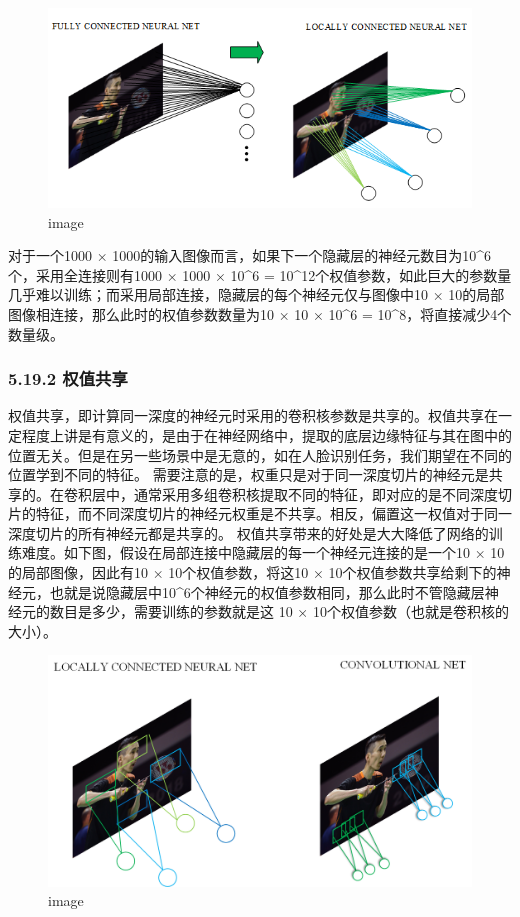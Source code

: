 \begin{figure}
\centering
\includegraphics{./img/ch5/5.27.1.png}
\caption{image}
\end{figure}

对于一个1000 ×
1000的输入图像而言，如果下一个隐藏层的神经元数目为10\^{}6个，采用全连接则有1000
× 1000 × 10\^{}6 =
10\^{}12个权值参数，如此巨大的参数量几乎难以训练；而采用局部连接，隐藏层的每个神经元仅与图像中10
× 10的局部图像相连接，那么此时的权值参数数量为10 × 10 × 10\^{}6 =
10\^{}8，将直接减少4个数量级。

\subsubsection{5.19.2 权值共享}\label{ux6743ux503cux5171ux4eab}

​
权值共享，即计算同一深度的神经元时采用的卷积核参数是共享的。权值共享在一定程度上讲是有意义的，是由于在神经网络中，提取的底层边缘特征与其在图中的位置无关。但是在另一些场景中是无意的，如在人脸识别任务，我们期望在不同的位置学到不同的特征。
需要注意的是，权重只是对于同一深度切片的神经元是共享的。在卷积层中，通常采用多组卷积核提取不同的特征，即对应的是不同深度切片的特征，而不同深度切片的神经元权重是不共享。相反，偏置这一权值对于同一深度切片的所有神经元都是共享的。
权值共享带来的好处是大大降低了网络的训练难度。如下图，假设在局部连接中隐藏层的每一个神经元连接的是一个10
× 10的局部图像，因此有10 × 10个权值参数，将这10 ×
10个权值参数共享给剩下的神经元，也就是说隐藏层中10\^{}6个神经元的权值参数相同，那么此时不管隐藏层神经元的数目是多少，需要训练的参数就是这
10 × 10个权值参数（也就是卷积核的大小）。

\begin{figure}
\centering
\includegraphics{./img/ch5/5.27.2.png}
\caption{image}
\end{figure}

